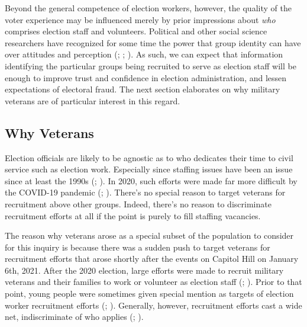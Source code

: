 \documentclass[
  12pt,
  letterpaper,
]{article}
\begin{document}
Beyond the general competence of election workers, however, the quality
of the voter experience may be influenced merely by prior impressions
about \emph{who} comprises election staff and volunteers. Political and
other social science researchers have recognized for some time the power
that group identity can have over attitudes and perception
(;
;
). As such, we can
expect that information identifying the particular groups being
recruited to serve as election staff will be enough to improve trust and
confidence in election administration, and lessen expectations of
electoral fraud. The next section elaborates on why military veterans
are of particular interest in this regard.

\subsection{Why Veterans}\label{why-veterans}

Election officials are likely to be agnostic as to who dedicates their
time to civil service such as election work. Especially since staffing
issues have been an issue since at least the 1990s
(;
). In 2020, such efforts
were made far more difficult by the COVID-19 pandemic
(; ). There's no special reason to target veterans for recruitment
above other groups. Indeed, there's no reason to discriminate
recruitment efforts at all if the point is purely to fill staffing
vacancies.

The reason why veterans arose as a special subset of the population to
consider for this inquiry is because there was a sudden push to target
veterans for recruitment efforts that arose shortly after the events on
Capitol Hill on January 6th, 2021. After the 2020 election, large
efforts were made to recruit military veterans and their families to
work or volunteer as election staff
(;
). Prior to that
point, young people were sometimes given special mention as targets of
election worker recruitment efforts (; ).
Generally, however, recruitment efforts cast a wide net, indiscriminate
of who applies (;
).
\end{document}
